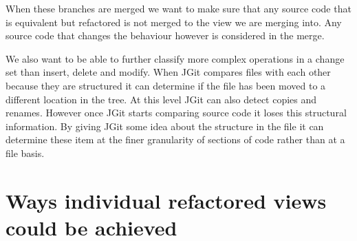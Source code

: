  When these branches are merged we want to make sure that any source code that is equivalent but refactored is not merged to the view we are merging into. Any source code that changes the behaviour however is considered in the merge.




We also want to be able to further classify more complex operations in a change set than insert, delete and modify.  When JGit compares files with each other because they are structured it can determine if the file has been moved to a different location in the tree.  At this level JGit can also detect copies and renames.  However once JGit starts comparing source code it loses this structural information.  By giving JGit some idea about the structure in the file it can determine these item at the finer granularity of sections of code rather than at a file basis.


\section{Ways individual refactored views could be achieved}
% 
% 
% 
% 
% 
% 

